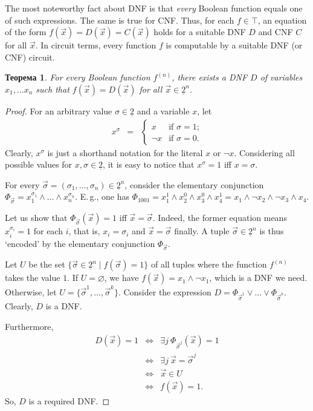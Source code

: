 \documentclass[12pt,notitlepage]{article}
\theoremstyle{plain}
\newtheorem{thm}{Теорема}[section]
\theoremstyle{definition}
\theoremstyle{plain}
\newcommand{\void}{\varnothing}
\newcommand{\ul}[1]{\underline{#1}}
\newcommand{\1}{\mathbf{1}}
\newcommand{\0}{\mathbf{0}}
\begin{document}
The most noteworthy fact about DNF is that \emph{every} Boolean function equals one of such expressions. The same is true for CNF. Thus, for each $f \in \top$, an equation of the form $f(\vec x) = D(\vec x) = C(\vec x)$ holds for a suitable DNF $D$ and CNF $C$ for all $\vec x$. In circuit terms, every function $f$ is computable by a suitable DNF (or CNF) circuit.
\begin{thm}\label{bool:dnf}
	For every Boolean function $f^{(n)}$, there exists a DNF $D$ of variables $x_1, \ldots x_n$ such that $f(\vec x) = D(\vec x)$ for all $\vec x \in \ul{2}^n$.
\end{thm}
\begin{proof}
	For an arbitrary value $\sigma \in \ul{2}$ and a variable $x$, let
	$$
	\begin{array}{rcl}
		x^\sigma&=&\begin{cases}
			x&\text{if $\sigma = 1$;}\\
			\neg x&\text{if $\sigma = 0$.}
		\end{cases}
	\end{array}
	$$
	Clearly, $x^\sigma$ is just a shorthand notation for the literal $x$ or $\neg x$. Considering all possible values for $x, \sigma \in \ul{2}$, it is easy to notice that $x^\sigma = 1$ iff $x = \sigma$.
	
	For every $\vec\sigma = (\sigma_1,\ldots, \sigma_n) \in \ul{2}^n$, consider the elementary conjunction $\Phi_{\vec \sigma} = x^{\sigma_1}_1 \wedge \ldots \wedge x^{\sigma_n}_n$. E.\,g., one has $\Phi_{1001} = x^1_1 \wedge x^0_2 \wedge x^0_3 \wedge x^1_4  = x_1 \wedge \neg x_2 \wedge \neg x_3 \wedge x_4$.
	
	Let us show that $\Phi_{\vec \sigma}(\vec x) = 1$ iff $\vec x = \vec \sigma$. Indeed, the former equation means $x^{\sigma_i}_i = 1$ for each $i$, that is, $x_i = \sigma_i$ and $\vec x = \vec \sigma$ finally. A tuple $\vec \sigma \in \ul{2}^n$ is thus `encoded' by the elementary conjunction $\Phi_{\vec\sigma}$.
	
	Let $U$ be the set $\{ \vec \sigma \in \ul{2}^n \mid f(\vec\sigma) = 1 \}$ of all tuples where the function $f^{(n)}$ takes the value $1$. If $U = \void$, we have $f(\vec x) = x_1 \wedge \neg x_1$, which is a DNF we need. Otherwise, let $U = \{\vec\sigma^1, \ldots,  \vec\sigma^k\}$. Consider the expression $D =  \Phi_{\vec \sigma^1} \vee \ldots \vee \Phi_{\vec \sigma^k}$. Clearly, $D$ is a DNF.
	
	Furthermore, 
	$$
	\begin{array}{rcl}
		D(\vec x) = 1 &\iff& \exists j\: \Phi_{\vec\sigma^j}(\vec x) = 1\\
		&\iff& \exists j\: \vec x = \vec\sigma^j\\
		&\iff& \vec x \in U\\
		&\iff& f(\vec x) = 1.
	\end{array}
	$$
	So, $D$ is a required DNF.
\end{proof}
\end{document}
